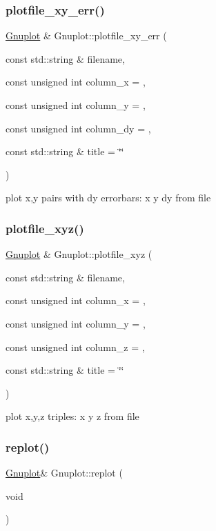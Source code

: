 \subsubsection{\texorpdfstring{plotfile\+\_\+xy\+\_\+err()}{plotfile\_xy\_err()}}
{\footnotesize\ttfamily \mbox{\hyperlink{class_gnuplot}{Gnuplot}} \& Gnuplot\+::plotfile\+\_\+xy\+\_\+err (\begin{DoxyParamCaption}\item[{const std\+::string \&}]{filename,  }\item[{const unsigned int}]{column\+\_\+x = {},  }\item[{const unsigned int}]{column\+\_\+y = {},  }\item[{const unsigned int}]{column\+\_\+dy = {},  }\item[{const std\+::string \&}]{title = {\ttfamily \char`\"{}\char`\"{}} }\end{DoxyParamCaption})}

plot x,y pairs with dy errorbars\+: x y dy from file \mbox{\label{class_gnuplot_a9dbde2a91eb816481657f3a22c9b0046}} 
\subsubsection{\texorpdfstring{plotfile\+\_\+xyz()}{plotfile\_xyz()}}
{\footnotesize\ttfamily \mbox{\hyperlink{class_gnuplot}{Gnuplot}} \& Gnuplot\+::plotfile\+\_\+xyz (\begin{DoxyParamCaption}\item[{const std\+::string \&}]{filename,  }\item[{const unsigned int}]{column\+\_\+x = {},  }\item[{const unsigned int}]{column\+\_\+y = {},  }\item[{const unsigned int}]{column\+\_\+z = {},  }\item[{const std\+::string \&}]{title = {\ttfamily \char`\"{}\char`\"{}} }\end{DoxyParamCaption})}

plot x,y,z triples\+: x y z from file \mbox{\label{class_gnuplot_a34c1b3e877d246a841a29f857a29f502}} 
\subsubsection{\texorpdfstring{replot()}{replot()}}
{\footnotesize\ttfamily \mbox{\hyperlink{class_gnuplot}{Gnuplot}}\& Gnuplot\+::replot (\begin{DoxyParamCaption}\item[{void}]{ }\end{DoxyParamCaption})\hspace{0.3cm}{\ttfamily [inline]}}



